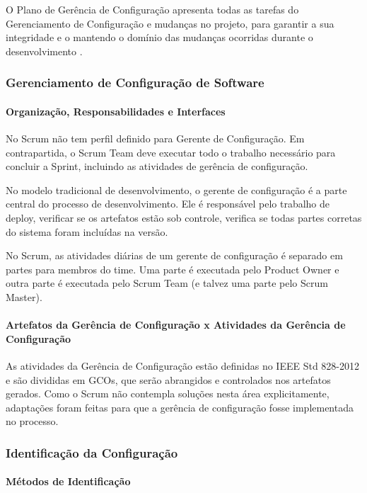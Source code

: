 O Plano de Gerência de Configuração apresenta todas as tarefas do Gerenciamento de Configuração e mudanças no projeto, para garantir a sua integridade e o mantendo o domínio das mudanças ocorridas durante o desenvolvimento \cite{moraes:16, 6170935}.

\subsubsection{Gerenciamento de Configuração de Software}

\paragraph{Organização, Responsabilidades e Interfaces} 

No Scrum não tem perfil definido para Gerente de Configuração. Em contrapartida, o Scrum Team deve executar todo o trabalho necessário para concluir a Sprint, incluindo as atividades de gerência de configuração.

No modelo tradicional de desenvolvimento, o gerente de configuração é a parte central do processo de desenvolvimento. Ele é responsável pelo trabalho de deploy, verificar se os artefatos estão sob controle, verifica se todas partes corretas do sistema foram incluídas na versão.

No Scrum, as atividades diárias de um gerente de configuração é separado em partes para membros do time. Uma parte é executada pelo Product Owner e outra parte é executada pelo Scrum Team (e talvez uma parte pelo Scrum Master).

\paragraph{Artefatos da Gerência de Configuração x Atividades da Gerência de Configuração} 

As atividades da Gerência de Configuração estão definidas no IEEE Std 828-2012 \cite{6170935} e são divididas em GCOs, que serão abrangidos e controlados nos artefatos gerados. Como o Scrum não contempla soluções nesta área explicitamente, adaptações foram feitas para que a gerência de configuração fosse implementada no processo.


 \subsubsection{Identificação da Configuração}

 \paragraph{Métodos de Identificação}

